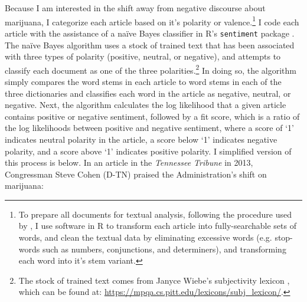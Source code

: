 



Because I am interested in the shift away from negative discourse about marijuana, I categorize each article based on it's polarity or valence.\footnote{To prepare all documents for textual analysis, following the procedure used by \citet{bail_2012}, I use software in R to transform each article into fully-searchable sets of words, and clean the textual data by eliminating excessive words (e.g. stop-words such as numbers, conjunctions, and determiners), and transforming each word into it's stem variant.} I code each article with the assistance of a na\"{i}ve Bayes classifier in \textsf{R}'s \texttt{sentiment} package \citep{jurka_2012}. The na\"{i}ve Bayes algorithm uses a stock of trained text that has been associated with three types of polarity (positive, neutral, or negative), and attempts to classify each document as one of the three polarities.\footnote{The stock of trained text comes from Janyce Wiebe's subjectivity lexicon \citep{wilson_et_al_2005}, which can be found at: \url{https://mpqa.cs.pitt.edu/lexicons/subj_lexicon/}.} In doing so, the algorithm simply compares the word stems in each article to word stems in each of the three dictionaries and classifies each word in the article as negative, neutral, or negative. Next, the algorithm calculates the log likelihood that a given article contains positive or negative sentiment, followed by a fit score, which is a ratio of the log likelihoods between positive and negative sentiment, where a score of `1' indicates neutral polarity in the article, a score below `1' indicates negative polarity, and a score above `1' indicates positive polarity. I simplified version of this process is below. In an article in the \textit{Tennessee Tribune} in 2013, Congressman Steve Cohen (D-TN) praised the Administration's shift on marijuana: 

